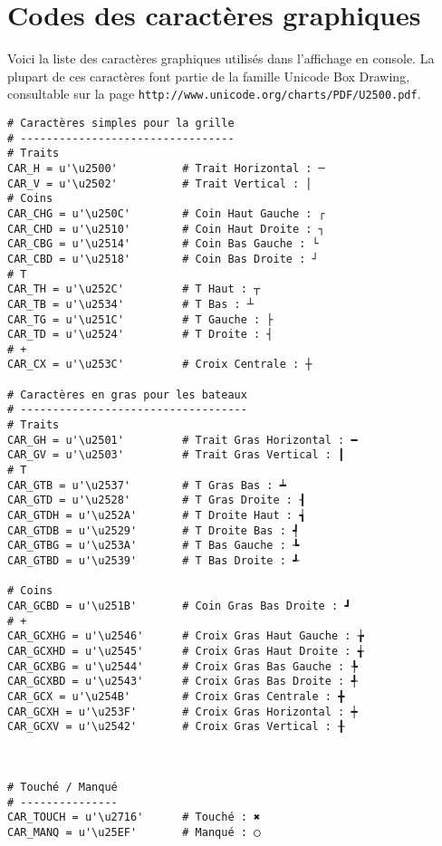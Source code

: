 \chapter{Codes des caractères graphiques}\label{annexe_codescar}

Voici la liste des caractères graphiques utilisés dans l'affichage en console. La plupart de ces caractères font partie de la famille Unicode Box Drawing, consultable sur la page  \texttt{http://www.unicode.org/charts/PDF/U2500.pdf}.

\begin{verbatim}
# Caractères simples pour la grille
# ---------------------------------
# Traits
CAR_H = u'\u2500'          # Trait Horizontal : ─
CAR_V = u'\u2502'          # Trait Vertical : │
# Coins
CAR_CHG = u'\u250C'        # Coin Haut Gauche : ┌
CAR_CHD = u'\u2510'        # Coin Haut Droite : ┐
CAR_CBG = u'\u2514'        # Coin Bas Gauche : └
CAR_CBD = u'\u2518'        # Coin Bas Droite : ┘
# T
CAR_TH = u'\u252C'         # T Haut : ┬
CAR_TB = u'\u2534'         # T Bas : ┴
CAR_TG = u'\u251C'         # T Gauche : ├
CAR_TD = u'\u2524'         # T Droite : ┤
# +
CAR_CX = u'\u253C'         # Croix Centrale : ┼

# Caractères en gras pour les bateaux
# -----------------------------------
# Traits
CAR_GH = u'\u2501'         # Trait Gras Horizontal : ━
CAR_GV = u'\u2503'         # Trait Gras Vertical : ┃
# T
CAR_GTB = u'\u2537'        # T Gras Bas : ┷
CAR_GTD = u'\u2528'        # T Gras Droite : ┨
CAR_GTDH = u'\u252A'       # T Droite Haut : ┪
CAR_GTDB = u'\u2529'       # T Droite Bas : ┩
CAR_GTBG = u'\u253A'       # T Bas Gauche : ┺
CAR_GTBD = u'\u2539'       # T Bas Droite : ┹

# Coins
CAR_GCBD = u'\u251B'       # Coin Gras Bas Droite : ┛
# +
CAR_GCXHG = u'\u2546'      # Croix Gras Haut Gauche : ╆
CAR_GCXHD = u'\u2545'      # Croix Gras Haut Droite : ╅
CAR_GCXBG = u'\u2544'      # Croix Gras Bas Gauche : ╄
CAR_GCXBD = u'\u2543'      # Croix Gras Bas Droite : ╃
CAR_GCX = u'\u254B'        # Croix Gras Centrale : ╋
CAR_GCXH = u'\u253F'       # Croix Gras Horizontal : ┿
CAR_GCXV = u'\u2542'       # Croix Gras Vertical : ╂



# Touché / Manqué
# ---------------
CAR_TOUCH = u'\u2716'      # Touché : ✖
CAR_MANQ = u'\u25EF'       # Manqué : ◯
\end{verbatim}
